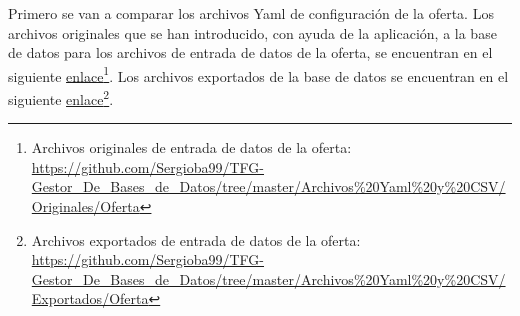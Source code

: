 Primero se van a comparar los archivos \acrshort{Yaml} de configuración de la oferta. Los archivos originales que se han introducido, con ayuda de la aplicación, a la base de datos para los archivos de entrada de datos de la oferta, se encuentran en el siguiente \href{https://github.com/Sergioba99/TFG-Gestor_De_Bases_de_Datos/tree/master/Archivos%20Yaml%20y%20CSV/Originales/Oferta}{enlace}\footnote{Archivos originales de entrada de datos de la oferta: \url{https://github.com/Sergioba99/TFG-Gestor\_De\_Bases\_de\_Datos/tree/master/Archivos\%20Yaml\%20y\%20CSV/Originales/Oferta}}. Los archivos exportados de la base de datos se encuentran en el siguiente \href{https://github.com/Sergioba99/TFG-Gestor_De_Bases_de_Datos/tree/master/Archivos%20Yaml%20y%20CSV/Exportados/Oferta}{enlace}\footnote{Archivos exportados de entrada de datos de la oferta: \url{https://github.com/Sergioba99/TFG-Gestor\_De\_Bases\_de\_Datos/tree/master/Archivos\%20Yaml\%20y\%20CSV/Exportados/Oferta}}. 











